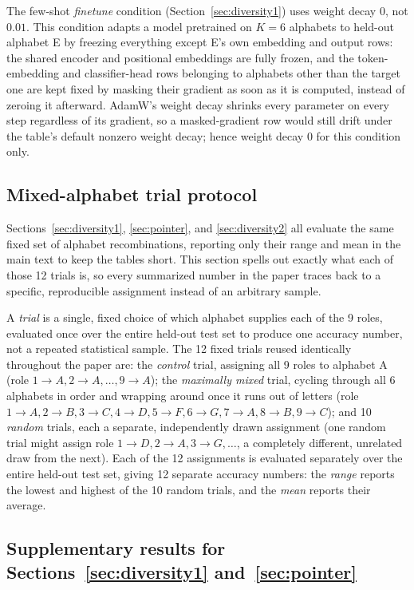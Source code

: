 \documentclass{article} %
\begin{document}
The few-shot \emph{finetune} condition (Section~\ref{sec:diversity1})
uses weight decay $0$, not $0.01$. This condition adapts a model pretrained on
$K=6$ alphabets to held-out alphabet E by freezing everything except
E's own embedding and output rows: the shared encoder and positional
embeddings are fully frozen, and the token-embedding and
classifier-head rows belonging to alphabets other than the target one
are kept fixed by masking their gradient as soon as it is computed,
instead of zeroing it afterward. AdamW's weight decay shrinks every
parameter on every step regardless of its gradient, so a masked-gradient
row would still drift under the table's default nonzero weight decay;
hence weight decay $0$ for this condition only.

\FloatBarrier
\subsection{Mixed-alphabet trial protocol}
\label{app:trials}

Sections~\ref{sec:diversity1}, \ref{sec:pointer}, and
\ref{sec:diversity2} all evaluate the same fixed set of alphabet
recombinations, reporting only their range and mean in the main text to
keep the tables short. This section spells out exactly what each of
those 12 trials is, so every summarized number in the paper traces back
to a specific, reproducible assignment instead of an arbitrary sample.

A \emph{trial} is a single, fixed choice of which alphabet supplies
each of the 9 roles, evaluated once over the entire held-out test set
to produce one accuracy number, not a repeated statistical sample. The
12 fixed trials reused identically throughout the paper are: the
\emph{control} trial, assigning all 9 roles to alphabet A (role
$1{\to}A, 2{\to}A, \ldots, 9{\to}A$); the \emph{maximally mixed} trial,
cycling through all 6 alphabets in order and wrapping around once it
runs out of letters (role $1{\to}A, 2{\to}B, 3{\to}C, 4{\to}D,
5{\to}F, 6{\to}G, 7{\to}A, 8{\to}B, 9{\to}C$); and 10 \emph{random}
trials, each a separate, independently drawn assignment (one random
trial might assign role $1{\to}D, 2{\to}A, 3{\to}G, \ldots$, a
completely different, unrelated draw from the next). Each of the 12
assignments is evaluated separately over the entire held-out test set,
giving 12 separate accuracy numbers: the \emph{range} reports the
lowest and highest of the 10 random trials, and the \emph{mean} reports
their average.

\subsection{Supplementary results for Sections~\ref{sec:diversity1}
and~\ref{sec:pointer}}
\label{app:supplementary}
\end{document}
